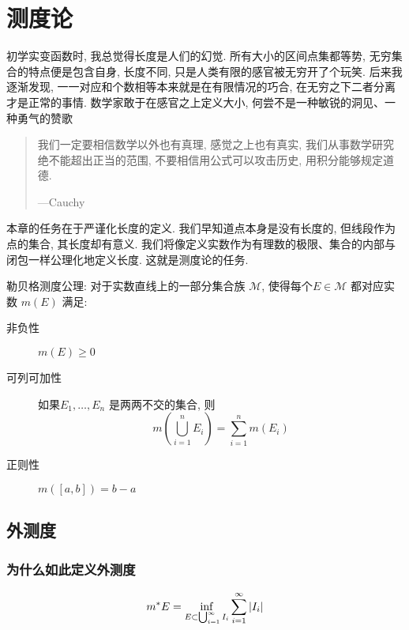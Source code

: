 \chapter{测度论}

初学实变函数时, 我总觉得长度是人们的幻觉. 所有大小的区间点集都等势, 无穷集合的特点便是包含自身,
长度不同, 只是人类有限的感官被无穷开了个玩笑. 后来我逐渐发现, 一一对应和个数相等本来就是在有限情况的巧合,
在无穷之下二者分离才是正常的事情. 数学家敢于在感官之上定义大小, 何尝不是一种敏锐的洞见、一种勇气的赞歌

\begin{quote}
    我们一定要相信数学以外也有真理, 感觉之上也有真实, 我们从事数学研究绝不能超出正当的范围,
    不要相信用公式可以攻击历史, 用积分能够规定道德.

    \hfill ---Cauchy
\end{quote}

本章的任务在于严谨化长度的定义. 我们早知道点本身是没有长度的, 但线段作为点的集合, 其长度却有意义.
我们将像定义实数作为有理数的极限、集合的内部与闭包一样公理化地定义长度. 这就是测度论的任务.

\begin{definition}
    勒贝格测度公理: 对于实数直线上的一部分集合族 \(\mathscr{M}\), 使得每个\(E \in
    \mathscr{M}\) 都对应实数 \(m(E)\) 满足:
    \begin{description}
        \item[非负性] \(m(E) \geq 0\)
        \item[可列可加性] 如果\(E_1, \dots ,E_{n}\) 是两两不交的集合, 则
            \[
                m\left(\bigcup_{i=1}^{n} E_i\right) =
                \sum_{i=1}^{n} m(E_i)
            \]
        \item[正则性] \(m([a,b])=b-a\)
    \end{description}
\end{definition}

\section{外测度}
\subsection{为什么如此定义外测度}

\begin{definition}
    \[
        m^{*} E=\inf_{E\subset \bigcup_{i=1}^{\infty} I_{i}}
        \sum_{i=1}^{\infty} \left|I_{i}\right|
    \]
\end{definition}

